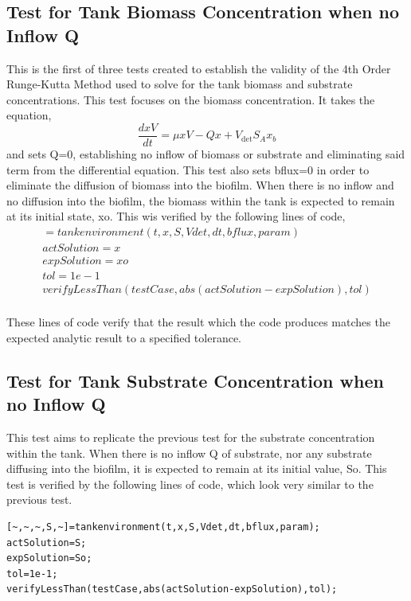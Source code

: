 \documentclass[letterpaper, twoside]{article}
\numberwithin{equation}{section}
\begin{document}
\subsection{Test for Tank Biomass Concentration when no Inflow Q}
This is the first of three tests created to establish the validity of the 4th Order Runge-Kutta Method used to solve for the tank biomass and substrate concentrations. This test focuses on the biomass concentration. It takes the equation,
\begin{equation}
  \frac{dx V}{dt} = \mu xV - Q x +V_{\mathrm{det}} S_A x_b
\end{equation}
and sets Q=0, establishing no inflow of biomass or substrate and eliminating said term from the differential equation. 
This test also sets bflux=0 in order to eliminate the diffusion of biomass into the biofilm. 
When there is no inflow and no diffusion into the biofilm, the biomass within the tank is expected to remain at its initial state, xo. This wis verified by the following lines of code,
\begin{align*}
[~,~,x,~,~]=tankenvironment(t,x,S,Vdet,dt,bflux,param) \\
actSolution=x \\
expSolution=xo \\
tol=1e-1 \\
verifyLessThan(testCase,abs(actSolution-expSolution),tol) \\
\end{align*}

These lines of code verify that the result which the code produces matches the expected analytic result to a specified tolerance.

\subsection{Test for Tank Substrate Concentration when no Inflow Q}
This test aims to replicate the previous test for the substrate concentration within the tank. When there is no inflow Q of substrate, nor any substrate diffusing into the biofilm, it is expected to remain at its initial value, So. This test is verified by the following lines of code, which look very similar to the previous test.

\begin{lstlisting}
[~,~,~,S,~]=tankenvironment(t,x,S,Vdet,dt,bflux,param);
actSolution=S; 
expSolution=So;
tol=1e-1;
verifyLessThan(testCase,abs(actSolution-expSolution),tol); 
\end{lstlisting}
\end{document}
